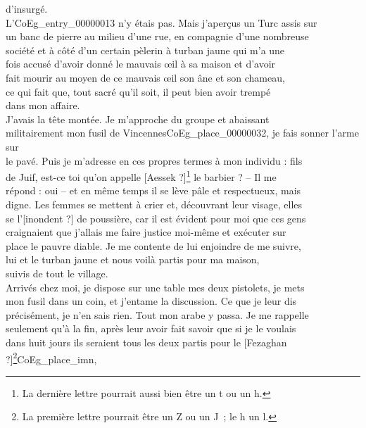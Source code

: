 \documentclass{book}
\begin{document}
d’insurgé.\\
\indent L’\gls{CoEg_entry_00000013} n’y étais pas. Mais j’aperçus un Turc assis sur\\
un banc de pierre au milieu d’une rue, en compagnie d’une nombreuse\\
société et à côté d’un certain pèlerin à turban jaune qui m’a une\\
fois accusé d’avoir donné le mauvais œil à sa maison et d’avoir\\
fait mourir au moyen de ce mauvais œil son âne et son chameau,\\
ce qui fait que, tout sacré qu’il soit, il peut bien avoir trempé\\
dans mon affaire.\\
\indent J’avais la tête montée. Je m’approche du groupe et abaissant\\
militairement mon fusil de Vincennes\gls{CoEg_place_00000032}, je fais sonner l’arme sur\\
le pavé. Puis je m’adresse en ces propres termes à mon individu : fils\\
de Juif, est-ce toi qu’on appelle {[Aessek ?]}\footnote{La dernière lettre pourrait aussi bien être un t ou un h.} le barbier ? – Il me\\
répond : oui – et en même temps il se lève pâle et respectueux, mais\\
digne. Les femmes se mettent à crier et, découvrant leur visage, elles\\
se l’{[inondent ?]} de poussière, car il est évident pour moi que ces gens\\
craignaient que j’allais me faire justice moi-même et exécuter sur\\
place le pauvre diable. Je me contente de lui enjoindre de me suivre,\\
lui et le turban jaune et nous voilà partis pour ma maison,\\
suivis de tout le village.\\
\indent Arrivés chez moi, je dispose sur une table mes deux pistolets, je mets\\
mon fusil dans un coin, et j’entame la discussion. Ce que je leur dis\\
précisément, je n’en sais rien. Tout mon arabe y passa. Je me rappelle\\
seulement qu’à la fin, après leur avoir fait savoir que si je le voulais\\
dans huit jours ils seraient tous les deux partis pour le {[Fezaghan ?]}\footnote{La première lettre pourrait être un Z ou un J~; le h un l.}\gls{CoEg_place_imn},\\
\end{document}

